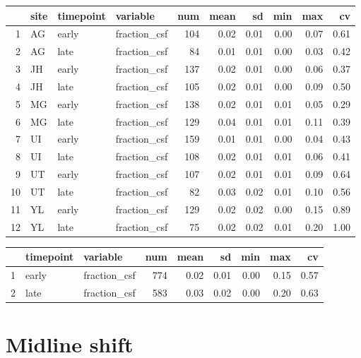 \documentclass[
]{article}
\begin{document}
\begin{table}[ht]
\centering
\begin{tabular}{rlllrrrrrr}
  \hline
 & site & timepoint & variable & num & mean & sd & min & max & cv \\ 
  \hline
1 & AG & early & fraction\_csf & 104 & 0.02 & 0.01 & 0.00 & 0.07 & 0.61 \\ 
  2 & AG & late & fraction\_csf &  84 & 0.01 & 0.01 & 0.00 & 0.03 & 0.42 \\ 
  3 & JH & early & fraction\_csf & 137 & 0.02 & 0.01 & 0.00 & 0.06 & 0.37 \\ 
  4 & JH & late & fraction\_csf & 105 & 0.02 & 0.01 & 0.00 & 0.09 & 0.50 \\ 
  5 & MG & early & fraction\_csf & 138 & 0.02 & 0.01 & 0.01 & 0.05 & 0.29 \\ 
  6 & MG & late & fraction\_csf & 129 & 0.04 & 0.01 & 0.01 & 0.11 & 0.39 \\ 
  7 & UI & early & fraction\_csf & 159 & 0.01 & 0.01 & 0.00 & 0.04 & 0.43 \\ 
  8 & UI & late & fraction\_csf & 108 & 0.02 & 0.01 & 0.01 & 0.06 & 0.41 \\ 
  9 & UT & early & fraction\_csf & 107 & 0.02 & 0.01 & 0.01 & 0.09 & 0.64 \\ 
  10 & UT & late & fraction\_csf &  82 & 0.03 & 0.02 & 0.01 & 0.10 & 0.56 \\ 
  11 & YL & early & fraction\_csf & 129 & 0.02 & 0.02 & 0.00 & 0.15 & 0.89 \\ 
  12 & YL & late & fraction\_csf &  75 & 0.02 & 0.02 & 0.01 & 0.20 & 1.00 \\ 
   \hline
\end{tabular}
\end{table}
\begin{table}[ht]
\centering
\begin{tabular}{rllrrrrrr}
  \hline
 & timepoint & variable & num & mean & sd & min & max & cv \\ 
  \hline
1 & early & fraction\_csf & 774 & 0.02 & 0.01 & 0.00 & 0.15 & 0.57 \\ 
  2 & late & fraction\_csf & 583 & 0.03 & 0.02 & 0.00 & 0.20 & 0.63 \\ 
   \hline
\end{tabular}
\end{table}

\hypertarget{midline-shift}{%
\section{Midline shift}\label{midline-shift}}
\end{document}
